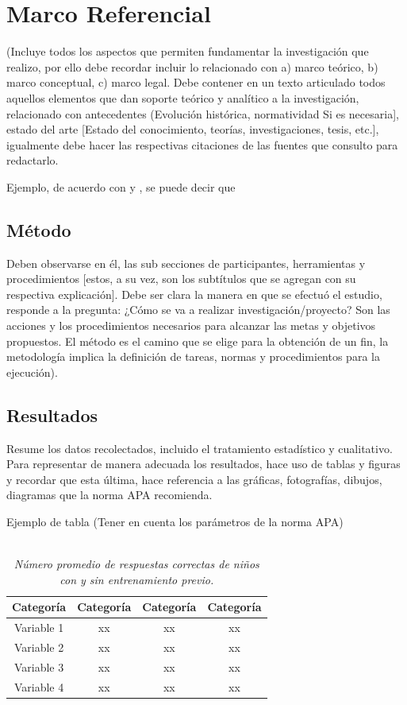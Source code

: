 \documentclass[11pt,openany]{book}
\begin{document}
\section{Marco Referencial}

(Incluye todos los aspectos que permiten fundamentar la investigación que realizo, por ello debe recordar incluir lo relacionado con a) marco teórico, b) marco conceptual, c) marco legal. Debe contener en un texto articulado todos aquellos elementos que dan soporte teórico y analítico a la investigación, relacionado con antecedentes (Evolución histórica, normatividad Si es necesaria], estado del arte [Estado del conocimiento, teorías, investigaciones, tesis, etc.], igualmente debe hacer las respectivas citaciones de las fuentes que consulto para redactarlo.

Ejemplo, de acuerdo con \parencite{2020} y \textcite{Al-Chalabi2024}, se puede decir que \lipsum[1]

\subsection{Método}

Deben observarse en él, las sub secciones de participantes, herramientas y procedimientos [estos, a su vez, son los subtítulos que se agregan con su respectiva explicación]. Debe ser clara la manera en que se efectuó el estudio, responde a la pregunta: ¿Cómo se va a realizar investigación/proyecto? Son las acciones y los procedimientos necesarios para alcanzar las metas y objetivos propuestos. El método es el camino que se elige para la obtención de un fin, la metodología implica la definición de tareas, normas y procedimientos para la ejecución).

\subsection{Resultados}

Resume los datos recolectados, incluido el tratamiento estadístico y cualitativo. Para representar de manera adecuada los resultados, hace uso de tablas y figuras y recordar que esta última, hace referencia a las gráficas, fotografías, dibujos, diagramas que la norma APA recomienda.

Ejemplo de tabla (Tener en cuenta los parámetros de la norma APA)

\begin{table}[H]
    \centering
    \caption{\justifying \\ \textit{Número promedio de respuestas correctas de niños con y sin entrenamiento previo.}}
    \begin{tabular}{cccc}
        \hline
        Categoría & Categoría & Categoría & Categoría \\
        \hline
        Variable 1 & xx & xx & xx \\
        Variable 2 & xx & xx & xx \\
        Variable 3 & xx & xx & xx \\
        Variable 4 & xx & xx & xx \\
         \hline
    \end{tabular}
    \label{tab:Tabla}
\end{table}
\end{document}
